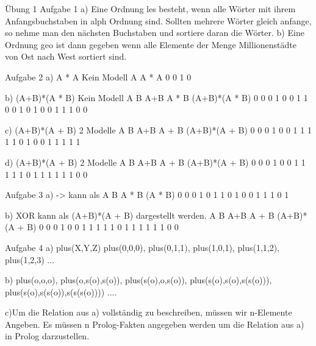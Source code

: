 Übung 1 
Aufgabe 1
a) Eine Ordnung les besteht, wenn alle Wörter  mit ihrem Anfangsbuchstaben in alph Ordnung sind.
   Sollten mehrere Wörter gleich anfange, so nehme man den nächsten Buchstaben und sortiere daran 
   die Wörter.
b) Eine Ordnung geo ist dann gegeben wenn alle Elemente der Menge Millionenstädte von Ost nach 
   West sortiert sind.
 
  
Aufgabe 2
a) A * \lnot A
Kein Modell
A	A * \lnot A
0	0
1	0

b) (A+B)*(\lnot A * \lnot B)
Kein Modell
A	B	A+B	\lnot A * \lnot B	(A+B)*(\lnot A * \lnot B)
0	0	0	1	0
0	1	1	0	0
1	0	1	0	0
1	1	1	0	0

c) (A+B)*(\lnot A + B)
2 Modelle
A	B	A+B	\lnot A + B	(A+B)*(\lnot A + B)
0	0	0	1	0
0	1	1	1	1
1	0	1	0	0
1	1	1	1	1

d) (A+B)*(\lnot A + \lnot B)
2 Modelle
A	B	A+B	\lnot A + \lnot B	(A+B)*(\lnot A + \lnot B)
0	0	0	1	0
0	1	1	1	1
1	0	1	1	1
1	1	1	0	0


Aufgabe 3
a) -> kann als
A	B	\lnot A * B	\lnot (\lnot A * B)
0	0	0	1
0	1	1	0
1	0	0	1
1	1	0	1

b) XOR kann als (A+B)*(\lnot A + \lnot B) dargestellt werden.
A	B	A+B	\lnot A + \lnot B	(A+B)*(\lnot A + \lnot B)
0	0	0	1	0
0	1	1	1	1
1	0	1	1	1
1	1	1	0	0

Aufgabe 4
a) plus(X,Y,Z)
	plus(0,0,0), plus(0,1,1), plus(1,0,1), plus(1,1,2), plus(1,2,3) ...
	
b) plus(o,o,o), plus(o,s(o),s(o)), plus(s(o),o,s(o)), plus(s(o),s(o),s(s(o))), plus(s(o),s(s(o)),s(s(s(o)))) ....

c)Um die Relation aus a) vollständig zu beschreiben, müssen wir n-Elemente Angeben.
  Es müssen n Prolog-Fakten angegeben werden um die Relation aus a) in Prolog darzustellen.